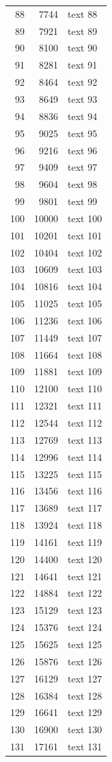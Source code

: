 \documentclass[10pt]{article}
\begin{document}
\begin{longtable}{rrl}
88&7744&text 88\\
89&7921&text 89\\
90&8100&text 90\\
91&8281&text 91\\
92&8464&text 92\\
93&8649&text 93\\
94&8836&text 94\\
95&9025&text 95\\
96&9216&text 96\\
97&9409&text 97\\
98&9604&text 98\\
99&9801&text 99\\
100&10000&text 100\\
101&10201&text 101\\
102&10404&text 102\\
103&10609&text 103\\
104&10816&text 104\\
105&11025&text 105\\
106&11236&text 106\\
107&11449&text 107\\
108&11664&text 108\\
109&11881&text 109\\
110&12100&text 110\\
111&12321&text 111\\
112&12544&text 112\\
113&12769&text 113\\
114&12996&text 114\\
115&13225&text 115\\
116&13456&text 116\\
117&13689&text 117\\
118&13924&text 118\\
119&14161&text 119\\
120&14400&text 120\\
121&14641&text 121\\
122&14884&text 122\\
123&15129&text 123\\
124&15376&text 124\\
125&15625&text 125\\
126&15876&text 126\\
127&16129&text 127\\
128&16384&text 128\\
129&16641&text 129\\
130&16900&text 130\\
131&17161&text 131\\

\end{longtable}
\end{document}
